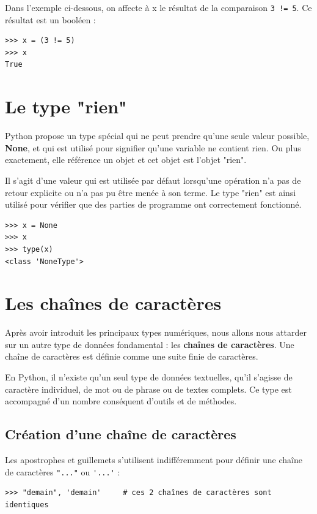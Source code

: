 \documentclass[12pt, a4paper]{article}
\begin{document}
Dans l'exemple ci-dessous, on affecte à x le résultat de la comparaison \lstinline{3 != 5}. Ce résultat est un booléen :
\begin{lstlisting}
>>> x = (3 != 5)
>>> x
True
\end{lstlisting}



\section{Le type "rien"}
Python propose un type spécial qui ne peut prendre qu'une seule valeur possible, \textbf{None}, et qui est utilisé pour signifier qu'une variable ne contient rien. Ou plus exactement, elle référence un objet et cet objet est l'objet "rien". 

Il s'agit d'une valeur qui est utilisée par défaut lorsqu'une opération n'a pas de retour explicite ou n'a pas pu être menée à son terme. Le type "rien" est ainsi utilisé pour vérifier que des parties de programme ont correctement fonctionné.

\begin{lstlisting}
>>> x = None
>>> x
>>> type(x)
<class 'NoneType'>
\end{lstlisting}



\section{Les chaînes de caractères}
Après avoir introduit les principaux types numériques, nous allons nous attarder sur un autre type de données fondamental : les \textbf{chaînes de caractères}. Une chaîne de caractères est définie comme une suite finie de caractères.

En Python, il n'existe qu'un seul type de données textuelles, qu'il s'agisse de caractère individuel, de mot ou de phrase ou de textes complets. Ce type est accompagné d'un nombre conséquent d'outils et de méthodes.

\subsection{Création d'une chaîne de caractères}
Les apostrophes et guillemets s'utilisent indifféremment pour définir une chaîne de caractères \lstinline{"..."} ou \lstinline{'...'} :
\begin{lstlisting}
>>> "demain", 'demain'     # ces 2 chaînes de caractères sont identiques
\end{lstlisting}
\end{document}

